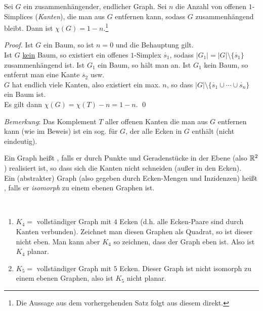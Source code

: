 \begin{theorem}
  Sei $ G $ ein zusammenhängender, endlicher Graph. Sei $ n $ die Anzahl von offenen $ 1 $-Simplices (\emph{Kanten}), die man aus $ G $ entfernen kann, sodass $ G $ zusammenhängend bleibt. Dann ist $ \chi(G) = 1 - n $.\footnote{Die Aussage aus dem vorhergehenden Satz folgt aus diesem direkt.}
  \begin{proof}
    Ist $ G $ ein Baum, so ist $ n = 0 $ und die Behauptung gilt. \\
    Ist $ G $ \underline{kein} Baum, so existiert ein offenes $ 1 $-Simplex $ \mathring{s_1} $, sodass $ \vert G_1 \vert = \vert G \vert \setminus \{ \mathring{s_1} \} $ zusammenhängend ist. Ist $ G_1 $ ein Baum, so hält man an. Ist $ G_1 $ kein Baum, so entfernt man eine Kante $ \mathring{s_2} $ usw. \\
    $ G $ hat endlich viele Kanten, also existiert ein max. $ n $, so dass $ \vert G \vert \setminus \{ \mathring{s_1} \cup \cdots \cup \mathring{s_n} \} $ ein Baum ist. \\
    Es gilt dann $ \chi(G) = \chi(T) - n = 1-n $. \qed
  \end{proof}
  \emph{Bemerkung}: Das Komplement $ T $ aller offenen Kanten die man aus $ G $ entfernen kann (wie im Beweis) ist ein sog. \label{def:spannenderBaum} für $ G $, der alle Ecken in $ G $ enthält (nicht eindeutig).
\end{theorem}

\begin{definition}
  Ein Graph heißt \label{def:eben}, falls er durch Punkte und Geradenstücke in der Ebene (also $ \mathbb{R}^2 $) realisiert ist, so dass sich die Kanten nicht schneiden (außer in den Ecken). \\
  Ein (abstrakter) Graph (also gegeben durch Ecken-Mengen und Inzidenzen) heißt \label{def:planar}, falls er \emph{isomorph} zu einem ebenen Graphen ist.  
\end{definition}

\begin{example}
  \
  \begin{enumerate}
    \item $ K_4 = $ vollständiger Graph mit $ 4 $ Ecken (d.h. alle Ecken-Paare sind durch Kanten verbunden). Zeichnet man diesen Graphen als Quadrat, so ist dieser nicht eben. Man kann aber $ K_4 $ so zeichnen, dass der Graph eben ist. Also ist $ K_4 $ planar.
    \item $ K_5 = $ vollständiger Graph mit $ 5 $ Ecken. Dieser Graph ist nicht isomorph zu einem ebenen Graphen, also ist $ K_5 $ nicht planar.
  \end{enumerate}
\end{example}

